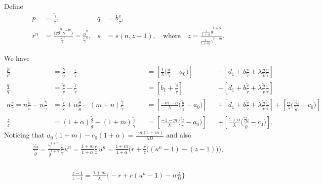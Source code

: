 \documentclass[a4paper,11pt]{article}
\def\tg{{\tilde{\gamma}}}
\def\tv{{\tilde{v}}}
\def\tth{{\tilde{\theta}}}
\def\ts{{\tilde{\tau}}}
\def\tu{{\tilde{u}}}
\def\dtg{\dot{\tilde{\gamma}}}
\def\dtv{\dot{\tilde{v}}}
\def\dtth{\dot{\tilde{\theta}}}
\def\dts{\dot{\tilde{\tau}}}
\def\dtu{\dot{\tilde{u}}}
\def\dpp{\dot{p}}
\def\dqq{\dot{q}}
\def\drr{\dot{r}}
\begin{document}
Define 
\begin{equation}\label{eq:pqrsdef}
 \begin{aligned}
  p &= \frac{\tg}{\ts}, & q&=b \frac{\tv}{\ts},\\
  r^n &= \frac{\big(\ts\tth^\alpha \tg^{-m}\big)}{\tg^n}= \frac{\tu^n}{\tg^n} , & s&=s(n,z-1), \quad\text{where}\quad z=\frac{ \frac{1}{1+\alpha}\tth^{1+\alpha}}{ \frac{1}{1+m}\tg^{1+m} }.
 \end{aligned}
\end{equation}

We have
\begin{align*}
 \frac{\dpp}{p}&=\frac{\dtg}{\tg} - \frac{\dts}{\ts}& &=\left[\frac{1}{\lambda }\Big(\frac{\tu}{\tg}-a_0\Big)\right] & &-\left[d_1 + b\frac{\tv}{\ts} + \lambda\frac{\tu}{\tv}\frac{\tv}{\ts}\right]\\
 \frac{\dqq}{q}&=\frac{\dtv}{\tv} - \frac{\dts}{\ts}& &=\left[b_1 +\frac{\tu}{\tv}\right] & &-\left[d_1 + b\frac{\tv}{\ts} + \lambda\frac{\tu}{\tv}\frac{\tv}{\ts}\right]\\
 n\frac{\drr}{r}=n\frac{\dtu}{\tu} - n\frac{\dtg}{\tg} &= \frac{\dts}{\ts} +\alpha \frac{\dtth}{\tth} - (m+n) \frac{\dtg}{\tg}& &=\left[\frac{-m-n}{\lambda }\Big(\frac{\tu}{\tg}-a_0\Big)\right]& &+\left[d_1 + b\frac{\tv}{\ts} + \lambda\frac{\tu}{\tv}\frac{\tv}{\ts}\right]+\left[\frac{\alpha}{\lambda }\Big(\frac{\ts\tu}{\tth}-c_0\Big)\right]\\
 \frac{\dot{z}}{z} &= (1+\alpha)\frac{\dtth}{\tth} - (1+m)\frac{\dtg}{\tg} & &=\left[\frac{-1-m}{\lambda }\Big(\frac{\tu}{\tg}-a_0\Big)\right] & &+ \left[\frac{1+\alpha}{\lambda }\Big(\frac{\ts\tu}{\tth}-c_0\Big)\right].%
\end{align*}
Noticing that $\displaystyle a_0(1+m)-c_0(1+\alpha)=\frac{-n(1+m)}{\lambda D}$ and also
\begin{align*}
 \frac{\ts\tu}{\tth} = \frac{\tg^{1+m}}{\tth^{1+\alpha}}\frac{\tu}{\tg}u^n = \frac{1+m}{1+\alpha} \frac{r}{z}\,u^n 
 =\frac{1+m}{1+\alpha}\Big( r + \frac{r}{z}\big((u^n-1) -(z-1)\big)\Big),
\end{align*}
\begin{align*}
\end{align*}

\begin{align*}
 \frac{\dot{z-1}}{z-1} = \frac{1+m}{\lambda} \bigg\{ -r + r(u^n-1) -n\frac{z}{D}\bigg\}
\end{align*}
\end{document}
